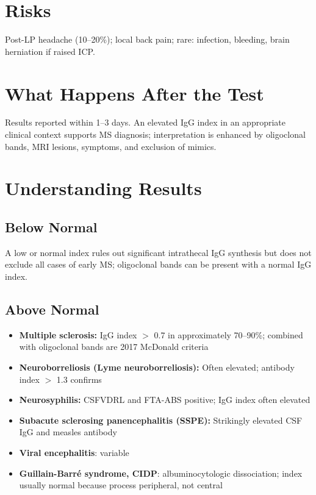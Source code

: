 \section*{Risks}
Post-LP headache (10--20\%); local back pain; rare: infection, bleeding, brain herniation if raised ICP.

\section*{What Happens After the Test}
Results reported within 1--3 days. An elevated IgG index in an appropriate clinical context supports MS diagnosis; interpretation is enhanced by oligoclonal bands, MRI lesions, symptoms, and exclusion of mimics.

\section*{Understanding Results}

\subsection*{Below Normal}
A low or normal index rules out significant intrathecal IgG synthesis but does not exclude all cases of early MS; oligoclonal bands can be present with a normal IgG index.

\subsection*{Above Normal}
\begin{itemize}
  \item \textbf{Multiple sclerosis:} IgG index $>$ 0.7 in approximately 70--90\%; combined with oligoclonal bands are 2017 McDonald criteria
  \item \textbf{Neuroborreliosis (Lyme neuroborreliosis):} Often elevated; antibody index $>$ 1.3 confirms
  \item \textbf{Neurosyphilis:} CSFVDRL and FTA-ABS positive; IgG index often elevated
  \item \textbf{Subacute sclerosing panencephalitis (SSPE):} Strikingly elevated CSF IgG and measles antibody
  \item \textbf{Viral encephalitis}: variable
  \item \textbf{Guillain-Barré syndrome, CIDP}: albuminocytologic dissociation; index usually normal because process peripheral, not central
\end{itemize}

